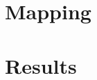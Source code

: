 \documentclass{eplmastersthesis}
\begin{document}
\chapter{Mapping} %


\chapter{Results} %


%

\printbibliography%

%

\backcoverpage
\end{document}
